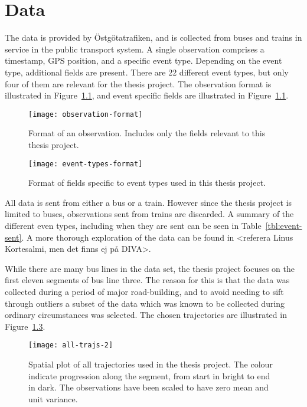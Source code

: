 \chapter{Data}\label{ch:data}
The data is provided by Östgötatrafiken, and is collected from buses
and trains in service in the public transport system.
A single observation comprises a timestamp, GPS position, and a
specific event type. Depending on the event type,
additional fields are present. There are 22 different event types,
but only four of them are relevant for the thesis project.
The observation format is illustrated in 
Figure~\ref{fig:example-observation}, and event specific fields are
illustrated in Figure~\ref{fig:example-observation}.
\begin{figure}
  \centering
  \texttt{[image: observation-format]}
  \caption{Format of an observation. Includes only the
    fields relevant to this thesis project.}\label{fig:example-observation}
\end{figure}

\begin{figure}
  \centering
  \texttt{[image: event-types-format]}
  \caption{Format of fields specific to event types used in this
    thesis project.}\label{fig:event-types-format}
\end{figure}
All data is sent from either a bus or a train. However since the thesis
project is limited to buses, observations sent from trains are
discarded. A summary of the different even types, including when they
are sent can be seen in Table~\ref{tbl:event-sent}. A more thorough
exploration of the data can be found in <referera Linus Kortesalmi,
men det finns ej på DIVA>.

While there are many bus lines in the data set, the thesis project
focuses on the first eleven segments of bus line three. The reason for
this is that the data was collected during a period of major
road-building, and to avoid needing to sift through outliers a subset
of the data which was known to be collected during ordinary
circumstances was selected. The chosen trajectories are illustrated in Figure~\ref{fig:all-trajs}.
\begin{figure}[ht]
  \centering
  \texttt{[image: all-trajs-2]}
  \caption{Spatial plot of all trajectories used in the thesis
    project. The colour indicate progression along the segment, from
    start in bright to end in dark. The observations have been scaled
    to have zero mean and unit variance.}\label{fig:all-trajs}
\end{figure}


